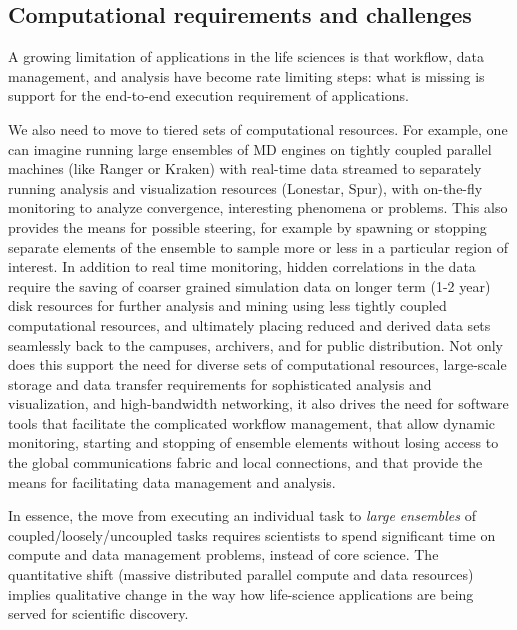 \documentclass{sig-alternate}
\begin{document}
\subsection{Computational requirements and challenges}

A growing limitation of applications in the life sciences is that workflow, data management, and
analysis have become rate limiting steps: what is missing is support for the end-to-end execution requirement of applications.

We also need to move to tiered sets of computational resources.  For
example, one can imagine running large ensembles of MD engines on
tightly coupled parallel machines (like Ranger or Kraken) with
real-time data streamed to separately running analysis and
visualization resources (Lonestar, Spur), with on-the-fly monitoring
to analyze convergence, interesting phenomena or problems.  This also
provides the means for possible steering, for example by spawning or
stopping separate elements of the ensemble to sample more or less in a
particular region of interest.  In addition to real time monitoring,
hidden correlations in the data require the saving of coarser grained
simulation data on longer term (1-2 year) disk resources for further
analysis and mining using less tightly coupled computational
resources, and ultimately placing reduced and derived data sets
seamlessly back to the campuses, archivers, and for public
distribution.  Not only does this support the need for diverse sets of
computational resources, large-scale storage and data transfer
requirements for sophisticated analysis and visualization, and
high-bandwidth networking, it also drives the need for software tools
that facilitate the complicated workflow management, that allow
dynamic monitoring, starting and stopping of ensemble elements without
losing access to the global communications fabric and local
connections, and that provide the means for facilitating data
management and analysis.

In essence, the move from executing an individual task to \textit{large
  ensembles} of coupled/loosely/uncoupled tasks requires scientists to spend
significant time on compute and data management problems, instead of
core science.  The quantitative shift (massive distributed parallel
compute and data resources) implies qualitative change in the way how life-science applications are being served for scientific discovery. 

\end{document}

